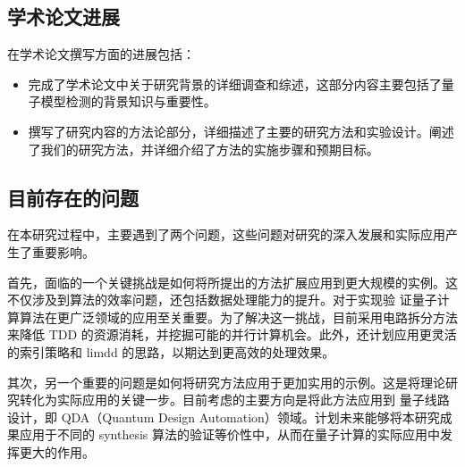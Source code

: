 \subsection{学术论文进展}
在学术论文撰写方面的进展包括：
\begin{itemize}
    \item 完成了学术论文中关于研究背景的详细调查和综述，这部分内容主要包括了量子模型检测的背景知识与重要性。
    \item 撰写了研究内容的方法论部分，详细描述了主要的研究方法和实验设计。阐述了我们的研究方法，并详细介绍了方法的实施步骤和预期目标。
\end{itemize}
\subsection{目前存在的问题}
在本研究过程中，主要遇到了两个问题，这些问题对研究的深入发展和实际应用产生了重要影响。


首先，面临的一个关键挑战是如何将所提出的方法扩展应用到更大规模的实例。这不仅涉及到算法的效率问题，还包括数据处理能力的提升。对于实现验
证量子计算算法在更广泛领域的应用至关重要。为了解决这一挑战，目前采用电路拆分方法来降低 TDD 的资源消耗，并挖掘可能的并行计算机会。此外，还计划应用更灵活的索引策略和 limdd 的思路，以期达到更高效的处理效果。

其次，另一个重要的问题是如何将研究方法应用于更加实用的示例。这是将理论研究转化为实际应用的关键一步。目前考虑的主要方向是将此方法应用到
量子线路设计，即 QDA（Quantum Design Automation）领域。计划未来能够将本研究成果应用于不同的 synthesis 算法的验证等价性中，从而在量子计算的实际应用中发挥更大的作用。